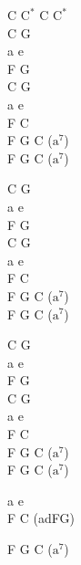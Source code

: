 \begin{chord}
    C $\mathrm{C^*}$ C $\mathrm{C^*}$\\
    C G\\
    a e\\
    F G\\
    C G\\
    a e\\
    F C\\
    F G C ($\mathrm{a^7}$)\\
    F G C ($\mathrm{a^7}$)

    C G\\
    a e\\
    F G\\
    C G\\
    a e\\
    F C\\
    F G C ($\mathrm{a^7}$)\\
    F G C ($\mathrm{a^7}$)

    C G\\
    a e\\
    F G\\
    C G\\
    a e\\
    F C\\
    F G C ($\mathrm{a^7}$)\\
    F G C ($\mathrm{a^7}$)

    a e\\
    F C (adFG)

    F G C ($\mathrm{a^7}$)
\end{chord}

